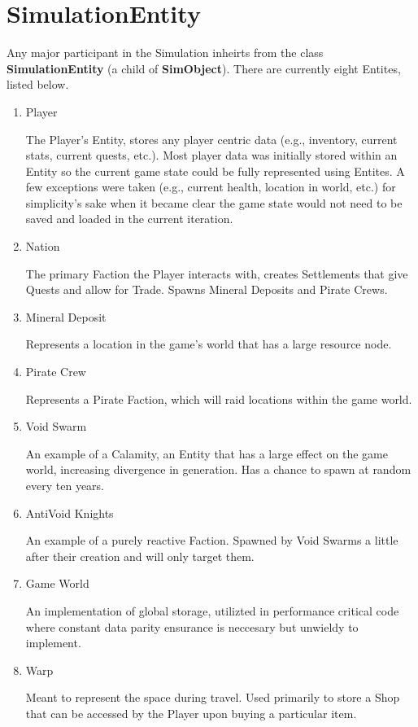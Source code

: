 \documentclass{report}
\begin{document}
\section{SimulationEntity}

Any major participant in the Simulation inheirts from the class \textbf{SimulationEntity} (a child of \textbf{SimObject}). There are currently eight Entites, listed below.

\begin{enumerate}

	\item Player

The Player's Entity, stores any player centric data (e.g., inventory, current stats, current quests, etc.). Most player data was initially stored within an Entity so the current game state could be fully represented using Entites. A few exceptions were taken (e.g., current health, location in world, etc.) for simplicity's sake when it became clear the game state would not need to be saved and loaded in the current iteration.

	\item Nation

The primary Faction the Player interacts with, creates Settlements that give Quests and allow for Trade. Spawns Mineral Deposits and Pirate Crews.

	\item Mineral Deposit

Represents a location in the game's world that has a large resource node.

	\item Pirate Crew

Represents a Pirate Faction, which will raid locations within the game world.

	\item Void Swarm

An example of a Calamity, an Entity that has a large effect on the game world, increasing divergence in generation. Has a chance to spawn at random every ten years.

	\item AntiVoid Knights

An example of a purely reactive Faction. Spawned by Void Swarms a little after their creation and will only target them.

	\item Game World

An implementation of global storage, utilizted in performance critical code where constant data parity ensurance is neccesary but unwieldy to implement. 

	\item Warp

Meant to represent the space during travel. Used primarily to store a Shop that can be accessed by the Player upon buying a particular item.

\end{enumerate}
\end{document}
